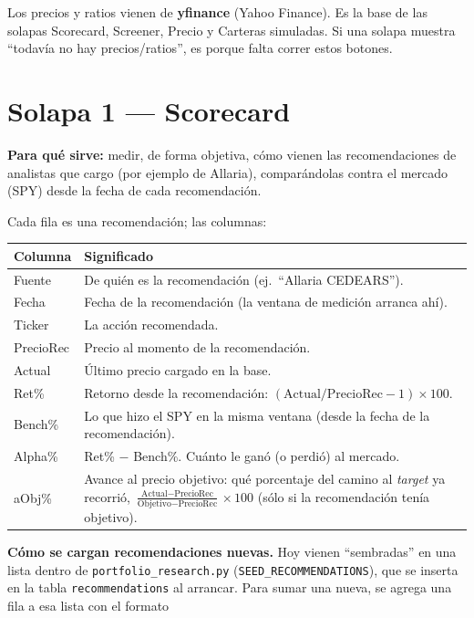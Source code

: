 \documentclass[11pt,a4paper]{article}
\newcommand{\code}[1]{\texttt{#1}}
\newcommand{\fpath}[1]{\texttt{#1}}
\begin{document}
\begin{nota}
Los precios y ratios vienen de \textbf{yfinance} (Yahoo Finance). Es la base de las
solapas Scorecard, Screener, Precio y Carteras simuladas. Si una solapa muestra
``todav\'ia no hay precios/ratios'', es porque falta correr estos botones.
\end{nota}

\section{Solapa 1 --- Scorecard}

\textbf{Para qu\'e sirve:} medir, de forma objetiva, c\'omo vienen las recomendaciones
de analistas que cargo (por ejemplo de Allaria), compar\'andolas contra el mercado
(SPY) desde la fecha de cada recomendaci\'on.

Cada fila es una recomendaci\'on; las columnas:

\begin{longtable}{L{2.4cm} L{11.7cm}}
\toprule
\textbf{Columna} & \textbf{Significado} \\
\midrule
\endhead
Fuente & De qui\'en es la recomendaci\'on (ej.\ ``Allaria CEDEARS''). \\
Fecha & Fecha de la recomendaci\'on (la ventana de medici\'on arranca ah\'i). \\
Ticker & La acci\'on recomendada. \\
PrecioRec & Precio al momento de la recomendaci\'on. \\
Actual & \'Ultimo precio cargado en la base. \\
Ret\% & Retorno desde la recomendaci\'on: $(\text{Actual}/\text{PrecioRec}-1)\times100$. \\
Bench\% & Lo que hizo el SPY en la misma ventana (desde la fecha de la recomendaci\'on). \\
Alpha\% & Ret\% $-$ Bench\%. Cu\'anto le gan\'o (o perdi\'o) al mercado. \\
aObj\% & Avance al precio objetivo: qu\'e porcentaje del camino al \emph{target} ya recorri\'o, $\frac{\text{Actual}-\text{PrecioRec}}{\text{Objetivo}-\text{PrecioRec}}\times100$ (s\'olo si la recomendaci\'on ten\'ia objetivo). \\
\bottomrule
\end{longtable}

\noindent\textbf{C\'omo se cargan recomendaciones nuevas.} Hoy vienen ``sembradas'' en
una lista dentro de \fpath{portfolio\_research.py} (\code{SEED\_RECOMMENDATIONS}), que
se inserta en la tabla \code{recommendations} al arrancar. Para sumar una nueva, se
agrega una fila a esa lista con el formato
\end{document}

